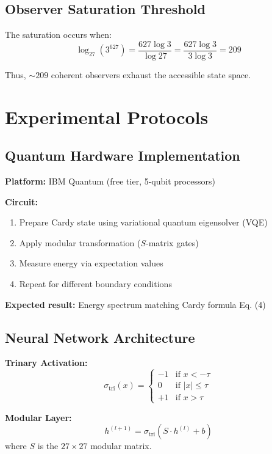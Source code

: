 \documentclass[11pt]{article}
\begin{document}
\subsection{Observer Saturation Threshold}

The saturation occurs when:
\begin{equation}
\log_{27}(3^{627}) = \frac{627 \log 3}{\log 27} = \frac{627 \log 3}{3 \log 3} = 209
\end{equation}

Thus, $\sim 209$ coherent observers exhaust the accessible state space.

\section{Experimental Protocols}

\subsection{Quantum Hardware Implementation}

\textbf{Platform:} IBM Quantum (free tier, 5-qubit processors)

\textbf{Circuit:}
\begin{enumerate}
\item Prepare Cardy state using variational quantum eigensolver (VQE)
\item Apply modular transformation ($S$-matrix gates)
\item Measure energy via expectation values
\item Repeat for different boundary conditions
\end{enumerate}

\textbf{Expected result:} Energy spectrum matching Cardy formula Eq. (4)

\subsection{Neural Network Architecture}

\textbf{Trinary Activation:}
\begin{equation}
\sigma_{\text{tri}}(x) = \begin{cases}
-1 & \text{if } x < -\tau \\
0 & \text{if } |x| \leq \tau \\
+1 & \text{if } x > \tau
\end{cases}
\end{equation}

\textbf{Modular Layer:}
\begin{equation}
h^{(l+1)} = \sigma_{\text{tri}}\left( S \cdot h^{(l)} + b \right)
\end{equation}
where $S$ is the $27 \times 27$ modular matrix.
\end{document}
